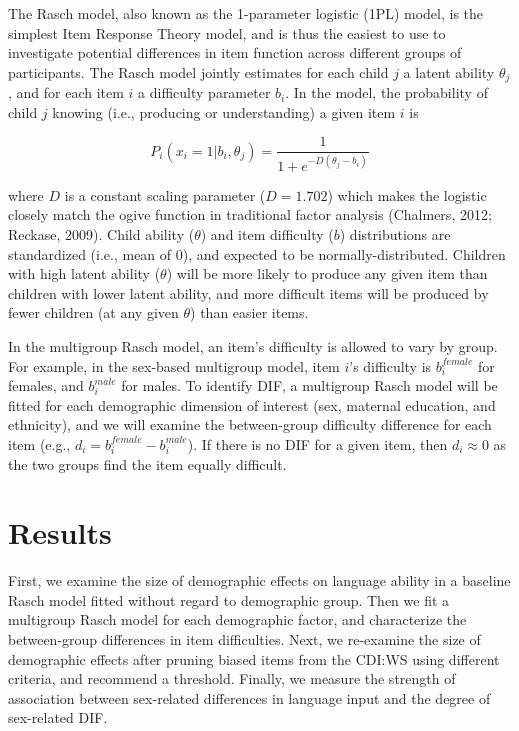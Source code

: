 \documentclass[10pt, letterpaper]{article}
\begin{document}
The Rasch model, also known as the 1-parameter logistic (1PL) model, is
the simplest Item Response Theory model, and is thus the easiest to use
to investigate potential differences in item function across different
groups of participants. The Rasch model jointly estimates for each child
\(j\) a latent ability \(\theta_j\), and for each item \(i\) a
difficulty parameter \(b_i\). In the model, the probability of child
\(j\) knowing (i.e., producing or understanding) a given item \(i\) is

\[P_{i}(x_i = 1 | b_{i},\theta_j ) = \frac{1}{1 + e^{-D(\theta_j - b_i )}}\]

\noindent where \(D\) is a constant scaling parameter (\(D=1.702\))
which makes the logistic closely match the ogive function in traditional
factor analysis (Chalmers, 2012; Reckase, 2009). Child ability
(\(\theta\)) and item difficulty (\(b\)) distributions are standardized
(i.e., mean of 0), and expected to be normally-distributed. Children
with high latent ability (\(\theta\)) will be more likely to produce any
given item than children with lower latent ability, and more difficult
items will be produced by fewer children (at any given \(\theta\)) than
easier items.

In the multigroup Rasch model, an item's difficulty is allowed to vary
by group. For example, in the sex-based multigroup model, item \(i\)'s
difficulty is \(b_{i}^{female}\) for females, and \(b_{i}^{male}\) for
males. To identify DIF, a multigroup Rasch model will be fitted for each
demographic dimension of interest (sex, maternal education, and
ethnicity), and we will examine the between-group difficulty difference
for each item (e.g., \(d_i = b_{i}^{female} - b_{i}^{male}\)). If there
is no DIF for a given item, then \(d_i \approx 0\) as the two groups
find the item equally difficult.

\hypertarget{results}{%
\section{Results}\label{results}}

First, we examine the size of demographic effects on language ability in
a baseline Rasch model fitted without regard to demographic group. Then
we fit a multigroup Rasch model for each demographic factor, and
characterize the between-group differences in item difficulties. Next,
we re-examine the size of demographic effects after pruning biased items
from the CDI:WS using different criteria, and recommend a threshold.
Finally, we measure the strength of association between sex-related
differences in language input and the degree of sex-related DIF.
\end{document}
